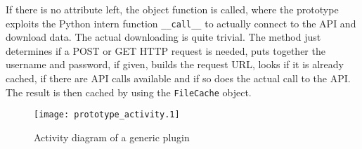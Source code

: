 If there is no attribute left, the object function is called, where the
prototype exploits the Python intern function \texttt{\_\_call\_\_} to actually
connect to the \Twitter{} API and download data. The actual downloading is
quite trivial. The method just determines if a POST or GET HTTP request
is needed, puts together the username and password, if given, builds the
request URL, looks if it is already cached, if there are API calls available
and if so does the actual call to the \Twitter{} API. The result is then cached
by using the \texttt{FileCache} object.


\begin{figure}
  \begin{center}
    \texttt{[image: prototype\_activity.1]}
    \caption{Activity diagram of a generic plugin}
  \end{center}
\end{figure}
